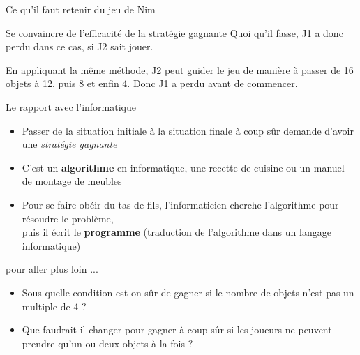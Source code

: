 \begin{frame}{Ce qu'il faut retenir du jeu de Nim}
\begin{block}{Se convaincre de l'efficacité de la stratégie gagnante}
    Quoi qu'il fasse, J1 a donc perdu dans ce cas, si J2 sait jouer.

    En appliquant la même méthode, J2 peut guider le jeu de manière à passer de
    16 objets à 12, puis 8 et enfin 4. Donc J1 a perdu avant de commencer.
    
  \end{block}

  \begin{block}{Le rapport avec l'informatique}
    \begin{itemize}
    \item Passer de la situation initiale à la situation finale à coup sûr demande d'avoir
      une \textit{stratégie gagnante}
    \item C'est un \alert{\textbf{algorithme}} en informatique, une recette de
      cuisine ou un manuel de montage de meubles
    \item Pour se faire obéir du tas de fils, l'informaticien cherche
      l'algorithme pour résoudre le problème,\\
      puis il écrit le \alert{\textbf{programme}} (traduction de l'algorithme
      dans un langage informatique)
    \end{itemize}
  \end{block}

\end{frame}

\begin{frame}

  \begin{block}{pour aller plus loin ...}
    \begin{itemize}
    \item Sous quelle condition est-on sûr de gagner si le nombre de objets n'est
      pas un multiple de 4 ?
    \item Que faudrait-il changer pour gagner à coup sûr si les joueurs ne peuvent
      prendre qu'un ou deux objets à la fois ?
    \end{itemize}
  \end{block}

\end{frame}

